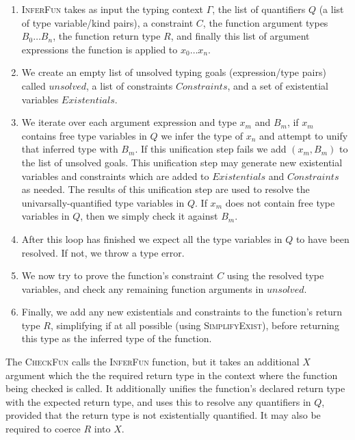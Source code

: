 \begin{enumerate}
\item \textsc{InferFun} takes as input the typing context $\Gamma$, the
  list of quantifiers $Q$ (a list of type variable/kind pairs), a
  constraint $C$, the function argument types $B_0\ldots B_n$, the
  function return type $R$, and finally this list of argument
  expressions the function is applied to $x_0\ldots x_n$.

\item We create an empty list of unsolved typing goals
  (expression/type pairs) called $\mathit{unsolved}$, a list of
  constraints $\mathit{Constraints}$, and a set of existential
  variables $\mathit{Existentials}$.

\item We iterate over each argument expression and type $x_m$ and
  $B_m$, if $x_m$ contains free type variables in $Q$ we infer the
  type of $x_n$ and attempt to unify that inferred type with $B_m$. If
  this unification step fails we add $(x_m, B_m)$ to the list of
  unsolved goals. This unification step may generate new existential
  variables and constraints which are added to $\mathit{Existentials}$
  and $\mathit{Constraints}$ as needed. The results of this
  unification step are used to resolve the univarsally-quantified type
  variables in $Q$. If $x_m$ does not contain free type variables in
  $Q$, then we simply check it against $B_m$.

\item After this loop has finished we expect all the type variables in
  $Q$ to have been resolved. If not, we throw a type error.

\item We now try to prove the function's constraint $C$ using the
  resolved type variables, and check any remaining function arguments
  in $\mathit{unsolved}$.

\item Finally, we add any new existentials and constraints to the
  function's return type $R$, simplifying if at all possible (using
  \textsc{SimplifyExist}), before returning this type as the inferred
  type of the function.
\end{enumerate}

\noindent The \textsc{CheckFun} calls the \textsc{InferFun} function, but it
takes an additional $X$ argument which the the required return type in
the context where the function being checked is called. It
additionally unifies the function's declared return type with the
expected return type, and uses this to resolve any quantifiers in $Q$,
provided that the return type is not existentially quantified. It may
also be required to coerce $R$ into $X$.

